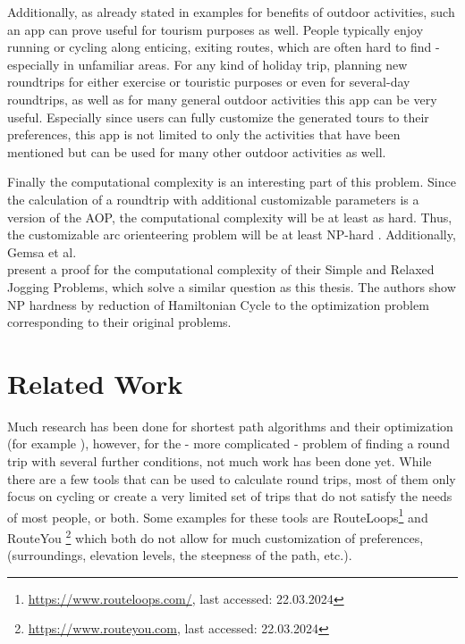 Additionally, as already stated in examples for benefits of outdoor activities, such an app can prove useful for tourism purposes as well. 
People typically enjoy running or cycling along enticing, exiting routes, which are often hard to find - especially in unfamiliar areas.
For any kind of holiday trip, planning new roundtrips for either exercise or touristic purposes or even for several-day roundtrips, as well as for many general outdoor activities this app can be very useful.
Especially since users can fully customize the generated tours to their preferences, this app is not limited to only the activities that have been mentioned but can be used for many other outdoor activities as well.

Finally the computational complexity is an interesting part of this problem. 
Since the calculation of a roundtrip with additional customizable parameters is a version of the AOP, the computational complexity will be at least as hard.
Thus, the customizable arc orienteering problem will be at least NP-hard \cite{agarwal_correlated_2023}.
Additionally, Gemsa et al.\\ \cite{gemsa_efficient_2013} present a proof for the computational complexity of their Simple and Relaxed Jogging Problems, which solve a similar question as this thesis.
The authors show NP hardness by reduction of Hamiltonian Cycle to the optimization problem corresponding to their original problems.






\section{Related Work}
\label{sec:relatedWork}


Much research has been done for shortest path algorithms and their optimization (for example \cite{cherkassky_shortest_1996, deo_shortest-path_1984, gallo_shortest_1988, madkour_survey_2017, sommer_shortest-path_2014, wayahdi_greedy_2021}), however, for the - more complicated \cite{gemsa_efficient_2013} - problem of finding a round trip with several further conditions, not much work has been done yet.
While there are a few tools that can be used to calculate round trips, most of them only focus on cycling or create a very limited set of trips that do not satisfy the needs of most people, or both. 
Some examples for these tools are RouteLoops\footnote{\url{https://www.routeloops.com/}, last accessed: 22.03.2024} and RouteYou \footnote{\url{https://www.routeyou.com}, last accessed: 22.03.2024} which both do not allow for much customization of preferences, (surroundings, elevation levels, the steepness of the path, etc.). 

